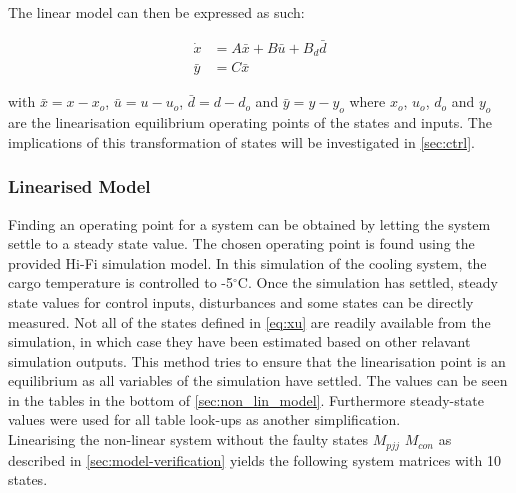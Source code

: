The linear model can then be expressed as such:

\begin{equation} \label{eq:state_space_linear}
	\begin{split}
		\dot{x} & = A\bar{x} + B\bar{u} + B_d\bar{d} \\
		\bar{y} & = C\bar{x}
	\end{split}
\end{equation}

with $\bar{x} = x-x_o$, $\bar{u} = u-u_o$, $\bar{d} = d-d_o$ and $\bar{y} = y-y_o$ where $x_o$, $u_o$, $d_o$ and $y_o$ are the linearisation equilibrium operating points of the states and inputs. The implications of this transformation of states will be investigated in \cref{sec:ctrl}.

\subsubsection{Linearised Model} \label{sec:linearised-model}
Finding an operating point for a system can be obtained by letting the system settle to a steady state value. The chosen operating point is found using the provided Hi-Fi simulation model. In this simulation of the cooling system, the cargo temperature is controlled to -5$^{\circ}$C. Once the simulation has settled, steady state values for control inputs, disturbances and some states can be directly measured. Not all of the states defined in \cref{eq:xu} are readily available from the simulation, in which case they have been estimated based on other relavant simulation outputs. This method tries to ensure that the linearisation point is an equilibrium as all variables of the simulation have settled. The values can be seen in the tables in the bottom of  \cref{sec:non_lin_model}. Furthermore steady-state values were used for all table look-ups as another simplification.\\

Linearising the non-linear system without the faulty states $ M_{pjj} $ $ M_{con} $ as described in \cref{sec:model-verification} yields the following system matrices with 10 states.

